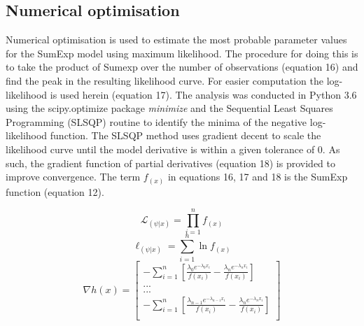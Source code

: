 \documentclass[11pt,usenames,dvipsnames,a4paper]{article}
\newcommand{\Lagr}{\mathcal{L}}
\begin{document}
\subsection{Numerical optimisation}

\begin{linenumbers}
\hspace{\parindent}
Numerical optimisation is used to estimate the most probable parameter values for the SumExp model using maximum likelihood. The procedure for doing this is to take the product of Sumexp over the number of observations (equation 16) and find the peak in the resulting likelihood curve. For easier computation the log-likelihood is used herein (equation 17). The analysis was conducted in Python 3.6 \citep{python} using the scipy.optimize package \textit{minimize} \citep{Jones2001} and the Sequential Least Squares Programming (SLSQP) routine \citep{Kraft1988} to identify the minima of the negative log-likelihood function. The SLSQP method uses gradient decent to scale the likelihood curve until the model derivative is within a given tolerance of 0. As such, the gradient function of partial derivatives (equation 18) is provided to improve convergence. The term $f_{(x)}$ in equations 16, 17 and 18 is the SumExp function (equation 12).
\end{linenumbers}

\begin{equation}
\Lagr_{(\psi|x)} = \prod_{i=1}^{n} f_{(x)}
\end{equation} 
\begin{equation}
\ell_{(\psi|x)} = \sum_{i=1}^{n} \ln f_{(x)}
\end{equation} 
\begin{equation}
\nabla h(x) = \begin{bmatrix} -\sum_{i=1}^{n} [\frac{\lambda_0 e^{-\lambda_0 x_i}}{f(x_i)} - \frac{\lambda_n e^{-\lambda_n x_i}}{f(x_i)}] \\
... \\
... \\
-\sum_{i=1}^{n} [\frac{\lambda_{n-1} e^{-\lambda_{n-1} x_i}}{f(x_i)} - \frac{\lambda_n e^{-\lambda_n x_i}}{f(x_i)}] \\
\end{bmatrix}
\end{equation}
\end{document}
